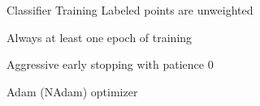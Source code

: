 \documentclass[aspectratio=169, 11pt, invertlogo]{ismll-slides}
\begin{document}

\begin{frame}[fragile]{Classifier Training}
	Labeled points are unweighted
	
	Always at least one epoch of training
	
	Aggressive early stopping with patience $0$
	
	Adam (NAdam) optimizer
\end{frame}

\end{document}
